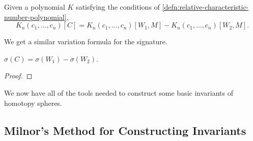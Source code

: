 \begin{corollary}\label{prop:relative-characteristic-number-variation}
	Given a polynomial $K$ satisfying the conditions of \cref{defn:relative-characteristic-number-polynomial},
	\[
		K_n(c_1,\ldots, c_n)[C] = K_n(c_1,\ldots, c_n)[W_1, M] - K_n(c_1,\ldots, c_n)[W_2, M].
	\]
\end{corollary}

We get a similar variation formula for the signature.

\begin{proposition}\label{prop:signature-variation}
	$\sigma(C)=\sigma(W_1)-\sigma(W_2)$.
\end{proposition}
\begin{proof}
\end{proof}

We now have all of the tools needed to construct some basic invariants of homotopy spheres.

\subsection{Milnor's Method for Constructing Invariants}\label{sec:milnor-method}

